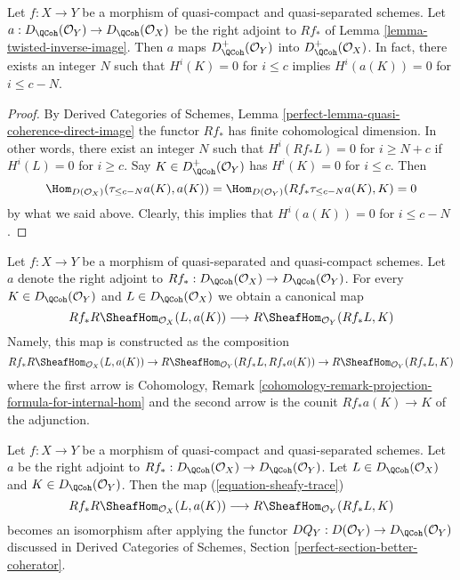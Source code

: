 \begin{lemma}
\label{lemma-twisted-inverse-image-bounded-below}
Let $f : X \to Y$ be a morphism of quasi-compact and quasi-separated
schemes. Let $a : D_\QCoh(\mathcal{O}_Y) \to D_\QCoh(\mathcal{O}_X)$
be the right adjoint to $Rf_*$ of Lemma \ref{lemma-twisted-inverse-image}.
Then $a$ maps $D^+_\QCoh(\mathcal{O}_Y)$ into $D^+_\QCoh(\mathcal{O}_X)$.
In fact, there exists an integer $N$ such that
$H^i(K) = 0$ for $i \leq c$ implies $H^i(a(K)) = 0$ for $i \leq c - N$.
\end{lemma}

\begin{proof}
By Derived Categories of Schemes, Lemma
\ref{perfect-lemma-quasi-coherence-direct-image}
the functor $Rf_*$ has finite cohomological dimension. In other words,
there exist an integer $N$ such that
$H^i(Rf_*L) = 0$ for $i \geq N + c$ if $H^i(L) = 0$ for $i \geq c$.
Say $K \in D^+_\QCoh(\mathcal{O}_Y)$ has $H^i(K) = 0$ for $i \leq c$.
Then
$$
\Hom_{D(\mathcal{O}_X)}(\tau_{\leq c - N}a(K), a(K)) =
\Hom_{D(\mathcal{O}_Y)}(Rf_*\tau_{\leq c - N}a(K), K) = 0
$$
by what we said above. Clearly, this implies that
$H^i(a(K)) = 0$ for $i \leq c - N$.
\end{proof}

\noindent
Let $f : X \to Y$ be a morphism of quasi-separated and quasi-compact
schemes. Let $a$ denote the right adjoint to
$Rf_* : D_\QCoh(\mathcal{O}_X) \to D_\QCoh(\mathcal{O}_Y)$. For every
$K \in D_\QCoh(\mathcal{O}_Y)$ and $L \in D_\QCoh(\mathcal{O}_X)$
we obtain a canonical map
\begin{equation}
\label{equation-sheafy-trace}
Rf_*R\SheafHom_{\mathcal{O}_X}(L, a(K))
\longrightarrow
R\SheafHom_{\mathcal{O}_Y}(Rf_*L, K)
\end{equation}
Namely, this map is constructed as the composition
$$
Rf_*R\SheafHom_{\mathcal{O}_X}(L, a(K)) \to
R\SheafHom_{\mathcal{O}_Y}(Rf_*L, Rf_*a(K)) \to
R\SheafHom_{\mathcal{O}_Y}(Rf_*L, K)
$$
where the first arrow is 
Cohomology, Remark
\ref{cohomology-remark-projection-formula-for-internal-hom}
and the second arrow is the counit $Rf_*a(K) \to K$ of the adjunction.

\begin{lemma}
\label{lemma-iso-on-RSheafHom}
Let $f : X \to Y$ be a morphism of quasi-compact and quasi-separated schemes.
Let $a$ be the right adjoint to
$Rf_* : D_\QCoh(\mathcal{O}_X) \to D_\QCoh(\mathcal{O}_Y)$.
Let $L \in D_\QCoh(\mathcal{O}_X)$ and $K \in D_\QCoh(\mathcal{O}_Y)$.
Then the map (\ref{equation-sheafy-trace})
$$
Rf_*R\SheafHom_{\mathcal{O}_X}(L, a(K))
\longrightarrow
R\SheafHom_{\mathcal{O}_Y}(Rf_*L, K)
$$
becomes an isomorphism after applying the functor
$DQ_Y : D(\mathcal{O}_Y) \to D_\QCoh(\mathcal{O}_Y)$
discussed in Derived Categories of Schemes, Section
\ref{perfect-section-better-coherator}.
\end{lemma}

